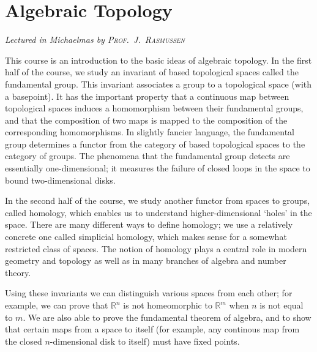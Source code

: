 \chapter[Algebraic Topology \\ \textnormal{\emph{Lectured in Michaelmas \oldstylenums{2022} by \textsc{Prof.\ J.\ Rasmussen}}}]{Algebraic Topology}
\emph{\Large Lectured in Michaelmas  by \textsc{Prof.\ J.\ Rasmussen}}

This course is an introduction to the basic ideas of algebraic topology.
In the first half of the course, we study an invariant of based topological spaces called the fundamental group.
This invariant associates a group to a topological space (with a basepoint).
It has the important property that a continuous map between topological spaces induces a homomorphism between their fundamental groups, and that the composition of two maps is mapped to the composition of the corresponding homomorphisms.
In slightly fancier language, the fundamental group determines a functor from the category of based topological spaces to the category of groups.
The phenomena that the fundamental group detects are essentially one-dimensional; it measures the failure of closed loops in the space to bound two-dimensional disks.

In the second half of the course, we study another functor from spaces to groups, called homology, which enables us to understand higher-dimensional `holes' in the space.
There are many different ways to define homology; we use a relatively concrete one called simplicial homology, which makes sense for a somewhat restricted class of spaces.
The notion of homology plays a central role in modern geometry and topology as well as in many branches of algebra and number theory.

Using these invariants we can distinguish various spaces from each other; for example, we can prove that \( \mathbb R^n \) is not homeomorphic to \( \mathbb R^m \) when \( n \) is not equal to \( m \).
We are also able to prove the fundamental theorem of algebra, and to show that certain maps from a space to itself (for example, any continous map from the closed \( n \)-dimensional disk to itself) must have fixed points.


